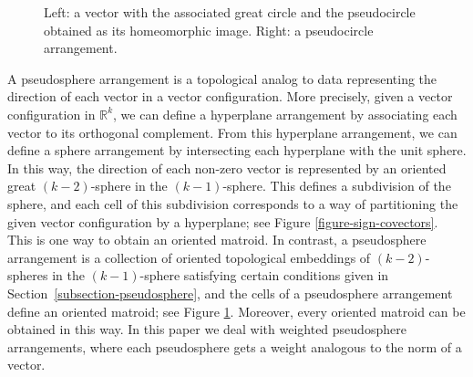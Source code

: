 \documentclass[11pt]{article}
\numberwithin{equation}{section}
\theoremstyle{remark}
\let\mb\mathbb
\begin{document}
\begin{figure}[htb]
\begin{center}
\end{center}

\caption{Left: a vector with the associated great circle and the pseudocircle obtained as its homeomorphic image.
Right: a pseudocircle arrangement.}
\label{figure-pseudosphere}

\end{figure}

A pseudosphere arrangement is a topological analog to data representing the direction of each vector in a vector configuration.
More precisely, given a vector configuration in $\mb{R}^k$, we can define a hyperplane arrangement by associating each vector to its orthogonal complement. From this hyperplane arrangement, we can define a sphere arrangement by intersecting each hyperplane with the unit sphere. In this way, the direction of each non-zero vector is represented by an oriented great $(k{-}2)$-sphere in the $(k{-}1)$-sphere.
This defines a subdivision of the sphere, and each cell of this subdivision corresponds to a way of partitioning the given vector configuration by a hyperplane; see Figure \ref{figure-sign-covectors}. This is one way to obtain an oriented matroid.
In contrast, a pseudosphere arrangement is a collection of oriented topological embeddings of $(k{-}2)$-spheres in the $(k{-}1)$-sphere satisfying certain conditions given in Section~\ref{subsection-pseudosphere}, and the cells of a pseudosphere arrangement define an oriented matroid; see Figure \ref{figure-pseudosphere}. Moreover, every oriented matroid can be obtained in this way.
In this paper we deal with weighted pseudosphere arrangements, where each pseudosphere gets a weight analogous to the norm of a vector.
\end{document}
